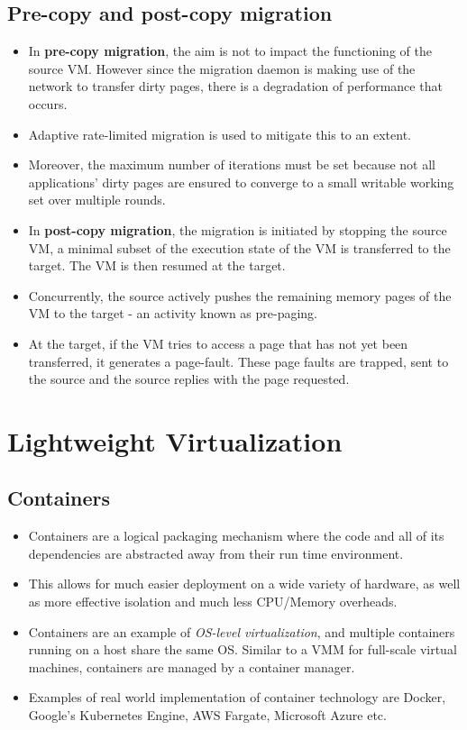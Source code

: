 \documentclass{article}
\begin{document}
\subsection{Pre-copy and post-copy migration}
\begin{itemize}
    \item In \textbf{pre-copy migration}, the aim is not to impact the functioning of the source VM. However since the migration daemon is making use of the network to transfer dirty pages, there is a degradation of performance that occurs.
    
    \item Adaptive rate-limited migration is used to mitigate this to an extent. 
    \item Moreover, the maximum number of iterations must be set because not all applications’ dirty pages are ensured to converge to a small writable working set over multiple rounds.
    
    \item In \textbf{post-copy migration}, the migration is initiated by stopping the source VM, a minimal subset of the execution state of the VM is transferred to the target. The VM is then resumed at the target.
    
    \item  Concurrently, the source actively pushes the remaining memory pages of the VM to the target - an activity known as pre-paging.
    
    \item At the target, if the VM tries to access a page that has not yet been transferred, it generates a page-fault. These page faults are trapped, sent to the source and the source replies with the page requested. 
\end{itemize}

\section{Lightweight Virtualization}
\subsection{Containers}
\begin{itemize}
    \item Containers are a logical packaging mechanism where the code and all of its dependencies are abstracted away from their run time environment. 
    
    \item This allows for much easier deployment on a wide variety of hardware, as well as more effective isolation and much less CPU/Memory overheads.
    
    \item Containers are an example of \textit{OS-level virtualization}, and multiple containers running on a host share the same OS. Similar to a VMM for full-scale virtual machines, containers are managed by a container manager. 
    
    \item Examples of real world implementation of container technology are Docker, Google's Kubernetes Engine, AWS Fargate, Microsoft Azure etc.
\end{itemize}
\end{document}
